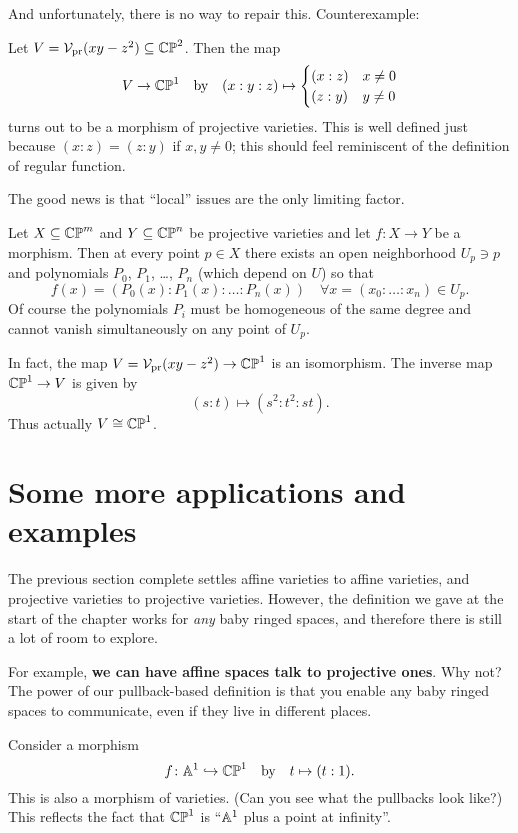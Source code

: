 And unfortunately, there is no way to repair this.
Counterexample:
\begin{example}
	Let $V = \mathcal V_{\text{pr}}(xy-z^2) \subseteq \mathbb{CP}^2$.
	Then the map
	\[
		V \to \mathbb{CP}^1
		\quad\text{by}\quad
		(x:y:z)
		\mapsto
		\begin{cases}
			(x:z) & x \neq 0 \\
			(z:y) & y \neq 0
		\end{cases}
	\]
	turns out to be a morphism of projective varieties.
	This is well defined just because $(x:z) = (z:y)$ if $x,y \neq 0$;
	this should feel reminiscent of the definition of regular function.
\end{example}
The good news is that ``local'' issues are the only limiting factor.
\begin{theorem}
	Let $X \subseteq \mathbb{CP}^m$ and $Y \subseteq \mathbb{CP}^n$ be projective varieties
	and let $f \colon  X \to Y$ be a morphism.
	Then at every point $p \in X$ there exists
	an open neighborhood $U_p \ni p$
	and polynomials $P_0$, $P_1$, \dots, $P_n$ (which depend on $U$) so that
	\[ f(x) = \left( P_0(x) : P_1(x) : \dots : P_n(x) \right)
		\quad \forall x = (x_0 : \dots : x_n) \in U_p. \]
	Of course the polynomials $P_i$ must be homogeneous of the same degree
	and cannot vanish simultaneously on any point of $U_p$.
\end{theorem}
\begin{example}
	In fact, the map $V = \mathcal V_{\text{pr}}(xy-z^2) \to \mathbb{CP}^1$ is an isomorphism.
	The inverse map $\mathbb{CP}^1 \to V$ is given by
	\[ (s:t) \mapsto (s^2:t^2:st). \]
	Thus actually $V \cong \mathbb{CP}^1$.
\end{example}

\section{Some more applications and examples}
The previous section complete settles affine varieties to affine varieties,
and projective varieties to projective varieties.
However, the definition we gave at the start of the chapter
works for \emph{any} baby ringed spaces,
and therefore there is still a lot of room to explore.

For example, \textbf{we can have affine spaces talk to projective ones}.
Why not?
The power of our pullback-based definition
is that you enable any baby ringed spaces to communicate,
even if they live in different places.
\begin{example}
	Consider a morphism
	\[ f \colon \mathbb A^1 \hookrightarrow \mathbb{CP}^1 \quad\text{by}\quad t \mapsto (t:1).  \]
	This is also a morphism of varieties.
	(Can you see what the pullbacks look like?)
	This reflects the fact that $\mathbb{CP}^1$ is ``$\mathbb A^1$ plus a point at infinity''.
\end{example}


